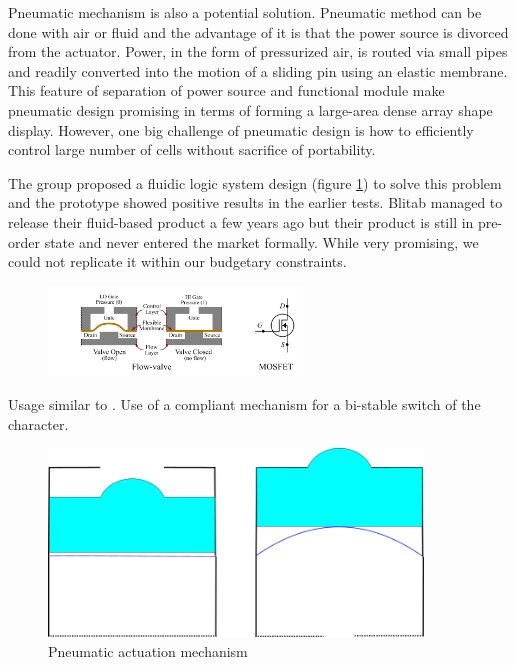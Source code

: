Pneumatic mechanism is also a potential solution. Pneumatic method can be done with air or fluid and the advantage of it is that the power source is divorced from the actuator.
Power, in the form of pressurized air, is routed via small pipes and readily converted into the motion of a sliding pin using an elastic membrane.
This feature of separation of power source and functional module make pneumatic design promising in terms of forming a large-area dense array shape display.
However, one big challenge of pneumatic design is how to efficiently control large number of cells without sacrifice of portability.

The group proposed a fluidic logic system design (figure \ref{fig:pneumatic-schema}) to solve this problem and the prototype showed positive results in the earlier tests.
Blitab managed to release their fluid-based product a few years ago but their product is still in pre-order state and never entered the market formally.
While very promising, we could not replicate it within our budgetary constraints.
\begin{figure}\centering
    \includegraphics[width=0.6\textwidth]{figures/pneumatic-schema.png}
\caption{}
\label{fig:pneumatic-schema}
\end{figure}

Usage similar to \cite{XieZhixin2021A2rB}. Use of a compliant mechanism for a bi-stable switch of the character.  
\begin{figure} \centering
    \includegraphics[height=5cm]{figures/pneumatic.png}
\caption{Pneumatic actuation mechanism}
\label{fig:pneumatic.png}
\end{figure}